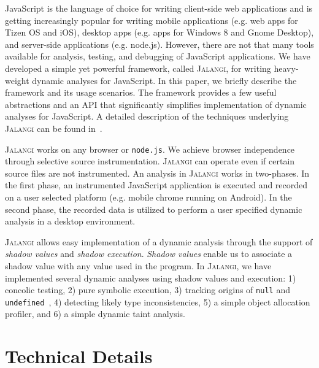 \documentclass{sig-alternate}
\def\jalangi{\textsc{Jalangi}}
\begin{document}
JavaScript is the language of choice for writing client-side web
applications and is getting increasingly popular for writing mobile
applications (e.g. web apps for Tizen OS and iOS), desktop apps
(e.g. apps for Windows 8 and Gnome Desktop), and server-side
applications (e.g. node.js).  However, there are not that many tools
available for analysis, testing, and debugging of JavaScript
applications.  We have developed a simple yet powerful framework,
called \jalangi{}, for writing heavy-weight dynamic analyses for
JavaScript.  In this paper, we briefly describe the framework and its
usage scenarios.  The framework provides a few useful abstractions and
an API that significantly simplifies implementation of dynamic
analyses for JavaScript.  A detailed description of the techniques
underlying \jalangi{} can be found in~\cite{SBGKfse13}.

\jalangi{} works on any browser or \texttt{node.js}.  We achieve
browser independence through selective source
instrumentation. \jalangi{} can operate even if certain source files
are not instrumented.  An analysis in \jalangi{} works in two-phases.
In the first phase, an instrumented JavaScript application is executed
and recorded on a user selected platform (e.g. mobile chrome running
on Android).  In the second phase, the recorded data is utilized to
perform a user specified dynamic analysis in a desktop environment.

\jalangi{} allows easy implementation of a dynamic analysis through
the support of \emph{shadow values} and \emph{shadow execution}.
\emph{Shadow values} enable us to associate a shadow value with any
value used in the program.  In \jalangi{}, we have implemented several
dynamic analyses using shadow values and execution: 1) concolic
testing, 2) pure symbolic execution, 3) tracking origins of
\texttt{null} and
\texttt{undefined}~\cite{Bond:2007:TBA:1297027.1297057}, 4) detecting
likely type inconsistencies, 5) a simple object allocation profiler,
and 6) a simple dynamic taint analysis.

\section{Technical Details}
\label{sec:technical-details}
\end{document}
